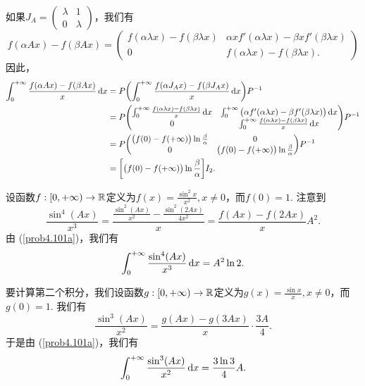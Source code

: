\begin{solution}
\begin{inparaenum}[(a)]
        如果$J_A=\begin{pmatrix}
          \lambda & 1 \\
          0 & \lambda
        \end{pmatrix}$，我们有
        \[
          f(\alpha Ax) - f(\beta Ax) =
          \begin{pmatrix}
            f(\alpha\lambda x) - f(\beta\lambda x) & \alpha xf'(\alpha\lambda x) - \beta xf'(\beta\lambda x) \\
            0 & f(\alpha\lambda x) - f(\beta\lambda x).
          \end{pmatrix}
        \]
        因此，
        \begin{align*}
          \int_0^{+\infty} \frac{f(\alpha Ax)-f(\beta Ax)}x \dif x & =
          P \left( \int_0^{+\infty} \frac{f(\alpha J_Ax)-f(\beta J_Ax)}x \dif x  \right) P^{-1} \\
          & = P \begin{pmatrix}
            \int_0^{+\infty} \frac{f(\alpha \lambda x)-f(\beta \lambda x)} x\dif x & \int_0^{+\infty}\big( \alpha f'(\alpha\lambda x) - \beta f'(\beta\lambda x) \big) \dif x\\
            0 & \int_0^{+\infty} \frac{f(\alpha \lambda x)-f(\beta \lambda x)} x\dif x
          \end{pmatrix} P^{-1} \\
          & = P \begin{pmatrix}
            \big( f(0) - f(+\infty) \big)\ln\frac\beta\alpha & 0 \\
            0 & \big( f(0) - f(+\infty) \big)\ln\frac\beta\alpha
          \end{pmatrix} P^{-1} \\
          & = \left[  \big(f(0)-f(+\infty)\big)\ln\frac\beta\alpha \right]I_2.
        \end{align*}

    \item 设函数$f:[0,+\infty)\to\mathbb R$定义为$f(x)=\frac{\sin^2x}{x^2},x\ne0$，而$f(0)=1$. 注意到
        \[
          \frac{\sin^4(Ax)}{x^3} = \frac{\frac{\sin^2(Ax)}{x^2} - \frac{\sin^2(2Ax)}{4x^2}}x = \frac{f(Ax) - f(2Ax)}x A^2.
        \]
        由 (\ref{prob4.101a})，我们有
        \[
          \int_0^{+\infty} \frac{\sin^4(Ax)}{x^3} \mathop{}\!\mathrm d x = A^2\ln2.
        \]

        要计算第二个积分，我们设函数$g:[0,+\infty)\to\mathbb R$定义为$g(x)=\frac{\sin x}x,x\ne0$，而$g(0)=1$. 我们有
        \[
          \frac{\sin^3(Ax)}{x^2} = \frac{g(Ax) - g(3Ax)}x \cdot \frac{3A}4.
        \]
        于是由 (\ref{prob4.101a})，我们有
        \[
          \int_0^{+\infty} \frac{\sin^3(Ax)}{x^2} \mathop{}\!\mathrm d x = \frac{3\ln3}4A.
        \]


\end{inparaenum}
\end{solution}
